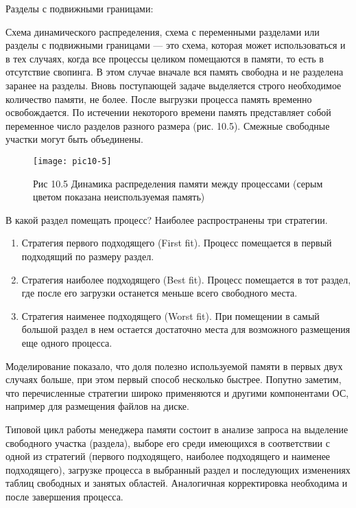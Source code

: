 Разделы с подвижными границами:

Схема динамического распределения, схема с переменными разделами или разделы с подвижными границами — это схема, которая может использоваться и в тех случаях, когда все процессы целиком помещаются в памяти, то есть в отсутствие свопинга. В этом случае вначале вся память свободна и не разделена заранее на разделы. Вновь поступающей задаче выделяется строго необходимое количество памяти, не более. После выгрузки процесса память временно освобождается. По истечении некоторого времени память представляет собой переменное число разделов разного размера (рис. 10.5). Смежные свободные участки могут быть объединены.

\begin{figure}
  \begin{center}
  \texttt{[image: pic10-5]}
  \caption{Рис 10.5 Динамика распределения памяти между процессами (серым цветом показана неиспользуемая память)}
  \end{center}
\end{figure}

В какой раздел помещать процесс? Наиболее распространены три стратегии.

\begin{enumerate}
  \item Стратегия первого подходящего (First fit). Процесс помещается в первый подходящий по размеру раздел.
  \item Стратегия наиболее подходящего (Best fit). Процесс помещается в тот раздел, где после его загрузки останется меньше всего свободного места.
  \item Стратегия наименее подходящего (Worst fit). При помещении в самый большой раздел в нем остается достаточно места для возможного размещения еще одного процесса.
\end{enumerate}

Моделирование показало, что доля полезно используемой памяти в первых двух случаях больше, при этом первый способ несколько быстрее. Попутно заметим, что перечисленные стратегии широко применяются и другими компонентами ОС, например для размещения файлов на диске.

Типовой цикл работы менеджера памяти состоит в анализе запроса на выделение свободного участка (раздела), выборе его среди имеющихся в соответствии с одной из стратегий (первого подходящего, наиболее подходящего и наименее подходящего), загрузке процесса в выбранный раздел и последующих изменениях таблиц свободных и занятых областей. Аналогичная корректировка необходима и после завершения процесса.

